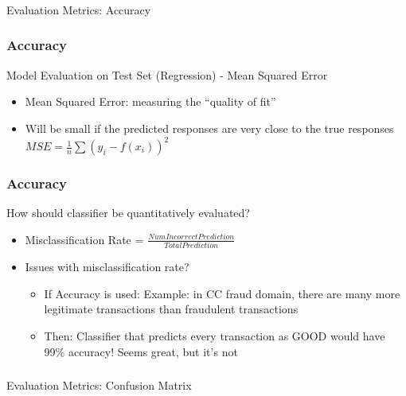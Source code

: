 \begin{frame}[fragile]\frametitle{}
\begin{center}
{\Large Evaluation Metrics: Accuracy}
\end{center}
\end{frame}

\begin{frame}[fragile]\frametitle{Accuracy}
Model Evaluation on Test Set (Regression) - Mean Squared Error
\begin{itemize}
\item Mean Squared Error: measuring the ``quality of fit''
\item Will be small if the predicted responses are very close to the true responses
$MSE = \frac{1}{n} \sum (y_i - f(x_i))^2$
\end{itemize}
\end{frame}

\begin{frame}[fragile]\frametitle{Accuracy}
How should classifier be quantitatively evaluated?
\begin{itemize}
\item Misclassification Rate = $\frac{NumIncorrectPrediction}{TotalPrediction}$
\item Issues with misclassification rate?
	\begin{itemize}
	\item If Accuracy is used: Example: in CC fraud domain, there are many more legitimate transactions than fraudulent transactions
	\item Then: Classifier that predicts every transaction as GOOD would have 99\% accuracy! Seems great, but it's not
	\end{itemize}
\end{itemize}

\end{frame}


\begin{frame}[fragile]\frametitle{}
\begin{center}
{\Large Evaluation Metrics: Confusion Matrix}
\end{center}
\end{frame}



